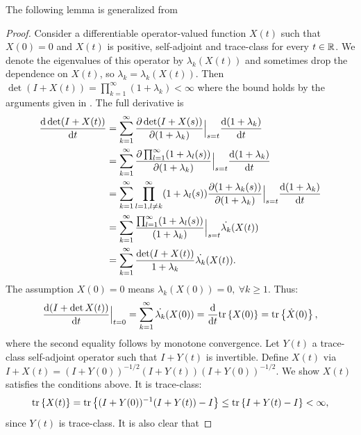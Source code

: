\documentclass{amsart}
\numberwithin{equation}{section}
\begin{document}
The following lemma is generalized from \cite[Chapter 9, Theorem 4, pp. 127]{Lax97}
\lax
\begin{proof}
  Consider a differentiable operator-valued function $X(t)$ such that
  $X(0) = 0$ and $X(t)$ is positive, self-adjoint and trace-class for
  every $t\in \mathbb{R}$. We denote the eigenvalues of this operator by
  $\lambda_k(X(t))$ and sometimes drop the dependence on $X(t)$, so
  $\lambda_k = \lambda_k(X(t))$.  Then $\det (I+X(t)) =
  \prod_{k=1}^{\infty} (1+\lambda_k) < \infty$ where the bound holds
  by the arguments given in \cite{AlexanderianGloorGhattas14}. The
  full derivative is
  \begin{align*}
    \frac{\text{\textup{d}} \det (I+X(t))}{\text{\textup{d}} t} 
    &= \sum_{k=1}^{\infty} 
    \frac{\partial \det (I+X(s))}{\partial (1+\lambda_k)}\Big |_{s=t}
    \frac{\text{\textup{d}} (1+\lambda_k)}{\text{\textup{d}} t} \\
    &= \sum_{k=1}^{\infty} \frac{\partial \prod_{l=1}^{\infty}
      (1+\lambda_l(s))}{\partial (1+\lambda_k)}\Big |_{s=t}
    \frac{\text{\textup{d}} (1+\lambda_k)}{\text{\textup{d}} t} \\
    &= \sum_{k=1}^{\infty} \prod_{l=1, l\neq k}^{\infty}
      (1+\lambda_l(s)) \frac{\partial (1+\lambda_k(s))}{\partial (1+\lambda_k)}\Big |_{s=t}
    \frac{\text{\textup{d}} (1+\lambda_k)}{\text{\textup{d}} t} \\
    &= \sum_{k=1}^{\infty} \frac{\prod_{l=1}^{\infty}
      (1+\lambda_l(s))}{(1+\lambda_k)}\Big |_{s=t}
    \dot{\lambda_k}(X(t)) \\
    &= \sum_{k=1}^{\infty} \frac{\det (I+X(t))}{1 +\lambda_k} \dot{\lambda_k}(X(t)).
  \end{align*}
  The assumption $X(0) = 0$ means $\lambda_k(X(0)) = 0,\ \forall k \geq 1$. Thus:
  \begin{align*}
    \frac{\text{\textup{d}} (I+\det X(t))}{\text{\textup{d}} t}\Big |_{t=0} 
    = \sum_{k=1}^{\infty} \dot{\lambda_k}(X(0)) 
    = \frac{\text{\textup{d}} }{\text{\textup{d}} t}\textup{tr}\left \{X(0) \right \}
    = \textup{tr}\left \{\dot{X}(0) \right \},
  \end{align*}
  where the second equality follows by monotone convergence. 
  Let $Y(t)$ a trace-class self-adjoint operator such that 
  $I+Y(t)$ is invertible.
  Define $X(t)$ via $I+X(t) = (I+Y(0))^{-1/2} (I+Y(t)) (I+Y(0))^{-1/2}$. 
  We show $X(t)$ satisfies the conditions above. It is trace-class:
  \begin{align*}
    \textup{tr}\left \{X(t) \right \} = \textup{tr}\left \{(I+Y(0))^{-1} (I+Y(t)) - I \right \}
    \leq \textup{tr}\left \{I+Y(t) - I \right \}< \infty,
  \end{align*}
  since $Y(t)$ is trace-class. It is also clear that

\end{proof}
\end{document}
